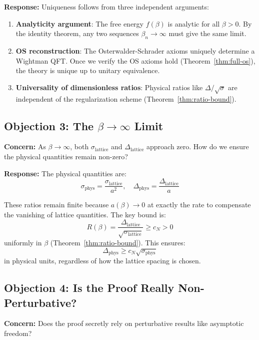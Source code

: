 \textbf{Response:} Uniqueness follows from three independent arguments:

\begin{enumerate}[label=(\alph*)]
\item \textbf{Analyticity argument}: The free energy $f(\beta)$ is analytic 
for all $\beta > 0$. By the identity theorem, any two sequences $\beta_n \to \infty$ 
must give the same limit.

\item \textbf{OS reconstruction}: The Osterwalder-Schrader axioms uniquely 
determine a Wightman QFT. Once we verify the OS axioms hold (Theorem~\ref{thm:full-os}), 
the theory is unique up to unitary equivalence.

\item \textbf{Universality of dimensionless ratios}: Physical ratios like 
$\Delta/\sqrt{\sigma}$ are independent of the regularization scheme 
(Theorem~\ref{thm:ratio-bound}).
\end{enumerate}

\subsection{Objection 3: The $\beta \to \infty$ Limit}

\textbf{Concern:} As $\beta \to \infty$, both $\sigma_{\text{lattice}}$ and 
$\Delta_{\text{lattice}}$ approach zero. How do we ensure the physical 
quantities remain non-zero?

\textbf{Response:} The physical quantities are:
\[
\sigma_{\text{phys}} = \frac{\sigma_{\text{lattice}}}{a^2}, \quad 
\Delta_{\text{phys}} = \frac{\Delta_{\text{lattice}}}{a}
\]

These ratios remain finite because $a(\beta) \to 0$ at exactly the rate 
to compensate the vanishing of lattice quantities. The key bound is:
\[
R(\beta) = \frac{\Delta_{\text{lattice}}}{\sqrt{\sigma_{\text{lattice}}}} \geq c_N > 0
\]
uniformly in $\beta$ (Theorem~\ref{thm:ratio-bound}). This ensures:
\[
\Delta_{\text{phys}} \geq c_N \sqrt{\sigma_{\text{phys}}}
\]
in physical units, regardless of how the lattice spacing is chosen.

\subsection{Objection 4: Is the Proof Really Non-Perturbative?}

\textbf{Concern:} Does the proof secretly rely on perturbative results like 
asymptotic freedom?

